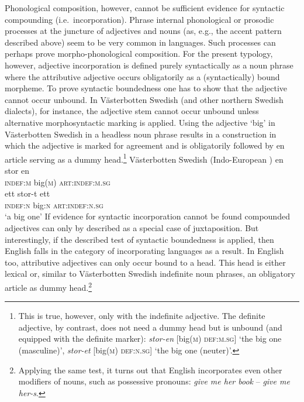 Phonological composition, however, cannot be sufficient evidence for syntactic compounding (i.e.~incorporation). Phrase internal phonological or prosodic processes at the juncture of adjectives and nouns (as, e.g., the accent pattern described above) seem to be very common in languages. Such processes can perhaps prove morpho-phonological composition. For the present typology, however, adjective incorporation is defined purely syntactically as a noun phrase where the attributive adjective occurs obligatorily as a (syntactically) bound morpheme. To prove syntactic boundedness one has to show that the adjective cannot occur unbound. In Västerbotten Swedish (and other northern Swedish dialects), for instance, the adjective stem cannot occur unbound unless alternative morphosyntactic marking is applied. Using the adjective ‘big’ in Västerbotten Swedish in a headless noun phrase results in a construction in which the adjective is marked for agreement and is obligatorily followed by en article serving as a dummy head.\footnote{This is true, however, only with the indefinite adjective. The definite adjective, by contrast, does not need a dummy head but is unbound (and equipped with the definite marker): \textit{stor-en} [big(\textsc{m}) \textsc{def:m.sg}] ‘the big one (masculine)’, \textit{stor-et} [big(\textsc{m}) \textsc{def:n.sg}] ‘the big one (neuter)’.}
\ea 
\label{bondska headless}
\rm{Västerbotten Swedish (Indo-European \citep{larsson1929})}
\ea
\gll 	en stor en\\	
	\textsc{indef:m} big(\textsc{m}) \textsc{art:indef:m.sg}\\
\ex
\gll 	ett stor-t ett\\	
	\textsc{indef:n} big:\textsc{n} \textsc{art:indef:n.sg}\\
\glt	‘a big one’
\z
\z
If evidence for syntactic incorporation cannot be found compounded adjectives can only by described as a special case of juxtaposition. But interestingly, if the described test of syntactic boundedness is applied, then English falls in the category of incorporating languages as a result. In English too, attributive adjectives can only occur bound to a head. This head is either lexical or, similar to Västerbotten Swedish indefinite noun phrases, an obligatory article as dummy head.\footnote{Applying the same test, it turns out that English incorporates even other modifiers of nouns, such as possessive pronouns: \textit{give me her book} – \textit{give me her-s}.}

